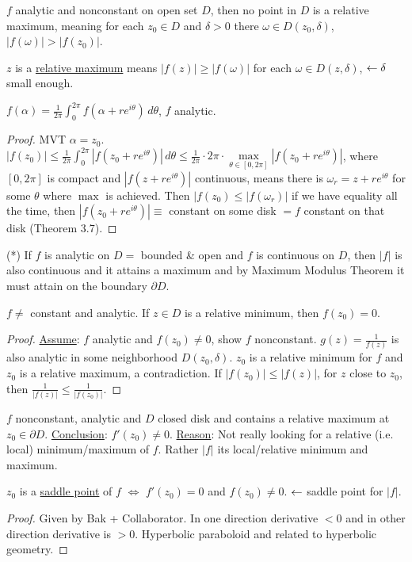 \documentclass[]{article}
\begin{document}
\begin{theorem}
	 $f$ analytic and nonconstant on open set $D$, then no point in $D$ is a relative maximum, meaning for each $z_0\in D$ and $\delta>0$ there $\omega\in D(z_0,\delta)$, $|f(\omega)|>|f(z_0)|$.
\end{theorem}
\begin{recall}
	$z$ is a \underline{relative maximum} means $|f(z)|\geq |f(\omega)|$ for each $\omega \in D(z,\delta)$, $\leftarrow \delta$ small enough.
\end{recall}
\begin{recall}
	 $f(\alpha) = \frac{1}{2\pi} \int_0^{2\pi} f(\alpha + re^{i\theta}) \, d\theta$, $f$ analytic.
\end{recall}
\begin{proof}
	MVT $\alpha = z_0$. $|f(z_0)| \leq \frac{1}{2\pi} \int_0^{2\pi} |f(z_0+re^{i\theta})|\, d\theta \leq \frac{1}{2\pi} \cdot 2\pi \cdot \underset{\theta\in[0,2\pi]}{\max}|f(z_0+re^{i\theta})|$, where $[0,2\pi]$ is compact and $|f(z+re^{i\theta})|$ continuous, means there is $\omega_r = z+re^{i\theta}$ for some $\theta$ where $\max$ is achieved. Then $|f(z_0)\leq |f(\omega_r)|$ if we have equality all the time, then $|f(z_0+re^{i\theta})| \equiv $ constant on some disk $ = f$ constant on that disk (Theorem 3.7).
\end{proof}
(*) If $f$ is analytic on $D = $ bounded \& open and $f$ is continuous on $D$, then $|f|$ is also continuous and it attains a maximum and by Maximum Modulus Theorem it must attain on the boundary $\partial D$.
\begin{theorem}
	 $f\neq$ constant and analytic. If $z\in D$ is a relative minimum, then \underline{$f(z_0) = 0$}.
\end{theorem}
\begin{proof}
	\underline{Assume}: $f$ analytic and $f(z_0)\neq 0$, show $f$ nonconstant. $g(z) = \frac{1}{f(z)}$ is also analytic in some neighborhood $D(z_0,\delta)$. $z_0$ is a relative minimum for $f$ and $z_0$ is a relative maximum, a contradiction. If $|f(z_0)|\leq |f(z)|$, for $z$ close to $z_0$, then $\frac{1}{|f(z)|} \leq \frac{1}{|f(z_0)|}$.
\end{proof}
\begin{theorem}
	$f$ nonconstant, analytic and $D$ closed disk and contains a relative maximum at $z_0\in \partial D$. \underline{Conclusion}: $f'(z_0) \neq 0$.
	\underline{Reason}: Not really looking for a relative (i.e. local) minimum/maximum of $f$. Rather $|f|$ its local/relative minimum and maximum.
\end{theorem}
\begin{theorem}
	$z_0$ is a \underline{saddle point} of $f$ $\iff$ $f'(z_0) = 0$ and $f(z_0) \neq 0$. $\leftarrow$ saddle point for $|f|$.
\end{theorem}
\begin{proof}
	Given by Bak + Collaborator. In one direction derivative $<0$ and in other direction derivative is $>0$. Hyperbolic paraboloid and related to hyperbolic geometry.
\end{proof}
\end{document}
